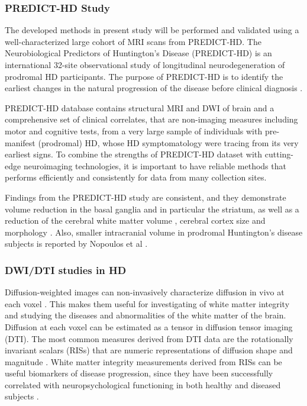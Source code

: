 \subsubsection{PREDICT-HD Study}

The developed methods in present study will be performed and validated using a well-characterized large cohort of MRI scans from PREDICT-HD. The Neurobiological Predictors of Huntington’s Disease (PREDICT-HD) is an international 32-site observational study of longitudinal neurodegeneration of prodromal HD participants. The purpose of PREDICT-HD is to identify the earliest changes in the natural progression of the disease before clinical diagnosis \cite{PREDICTHD}. 

PREDICT-HD database contains structural MRI and DWI of brain and a comprehensive set of clinical correlates, that are non-imaging measures including motor and cognitive tests, from a very large sample of individuals with pre-manifest (prodromal) HD, whose HD symptomatology were tracing from its very earliest signs. To combine the strengths of PREDICT-HD dataset with cutting-edge neuroimaging technologies, it is important to have reliable methods that performs efficiently and consistently for data from many collection sites.

Findings from the PREDICT-HD study are consistent, and they demonstrate volume reduction in the basal ganglia and in particular the striatum, as well as a reduction of the cerebral white matter volume \cite{Paulsen2008a, Rosas2001}, cerebral cortex size \cite{Paulsen2006} and morphology \cite{Nopoulos2010}. Also, smaller intracranial volume in prodromal Huntington’s disease subjects is reported by Nopoulos et al \cite{Nopoulos2011co}.
\newline

\subsubsection{DWI/DTI studies in HD}

Diffusion-weighted images can non-invasively characterize diffusion in vivo at each voxel \cite{Basser2002}. This makes them useful for investigating of white matter integrity and studying the diseases and abnormalities of the white matter of the brain. Diffusion at each voxel can be estimated as a tensor in diffusion tensor imaging (DTI). The most common measures derived from DTI data are the rotationally invariant scalars (RISs) that are numeric representations of diffusion shape and magnitude \cite{Basser1996}. White matter integrity measurements derived from RISs can be useful biomarkers of disease progression, since they have been successfully correlated with neuropsychological functioning in both healthy and diseased subjects \cite{Chua2009}.

